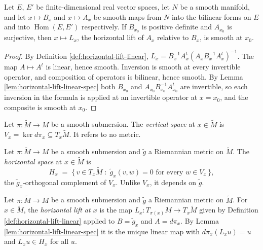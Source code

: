 \begin{lemma}
\label{lem:horizontal-lift-smooth-in-data}
\leanok
{}
Let $E$, $E'$ be finite-dimensional real vector spaces, let $N$ be a smooth manifold, and let $x \mapsto B_x$ and $x \mapsto A_x$ be smooth maps from $N$ into the bilinear forms on $E$ and into $\operatorname{Hom}(E,E')$ respectively. If $B_{x_0}$ is positive definite and $A_{x_0}$ is surjective, then $x \mapsto L_x$, the horizontal lift of $A_x$ relative to $B_x$, is smooth at $x_0$.
\end{lemma}

\begin{proof}
\leanok
{}
By Definition \ref{def:horizontal-lift-linear}, $L_x = B_x^{-1}A_x^t(A_xB_x^{-1}A_x^t)^{-1}$. The map $A \mapsto A^t$ is linear, hence smooth. Inversion is smooth at every invertible operator, and composition of operators is bilinear, hence smooth. By Lemma \ref{lem:horizontal-lift-linear-spec} both $B_{x_0}$ and $A_{x_0}B_{x_0}^{-1}A_{x_0}^t$ are invertible, so each inversion in the formula is applied at an invertible operator at $x = x_0$, and the composite is smooth at $x_0$.
\end{proof}

\begin{definition}
\label{def:vertical-space}
\leanok
{}
Let $\pi : \tilde{M} \to M$ be a smooth submersion. The \emph{vertical space} at $x \in \tilde{M}$ is $V_x = \ker d\pi_x \subseteq T_x\tilde{M}$. It refers to no metric.
\end{definition}

\begin{definition}
\label{def:horizontal-space}
\leanok
{}
Let $\pi : \tilde{M} \to M$ be a smooth submersion and $\tilde{g}$ a Riemannian metric on $\tilde{M}$. The \emph{horizontal space} at $x \in \tilde{M}$ is
\[
H_x \;=\; \{\, v \in T_x\tilde{M} \;:\; \tilde{g}_x(v,w) = 0 \text{ for every } w \in V_x \,\} ,
\]
the $\tilde{g}_x$-orthogonal complement of $V_x$. Unlike $V_x$, it depends on $\tilde{g}$.
\end{definition}

\begin{definition}
\label{def:horizontal-lift-tangent}
\leanok
{}
Let $\pi : \tilde{M} \to M$ be a smooth submersion and $\tilde{g}$ a Riemannian metric on $\tilde{M}$. For $x \in \tilde{M}$, the \emph{horizontal lift at $x$} is the map $L_x : T_{\pi(x)}M \to T_x\tilde{M}$ given by Definition \ref{def:horizontal-lift-linear} applied to $B = \tilde{g}_x$ and $A = d\pi_x$. By Lemma \ref{lem:horizontal-lift-linear-spec} it is the unique linear map with $d\pi_x(L_x u) = u$ and $L_x u \in H_x$ for all $u$.
\end{definition}

